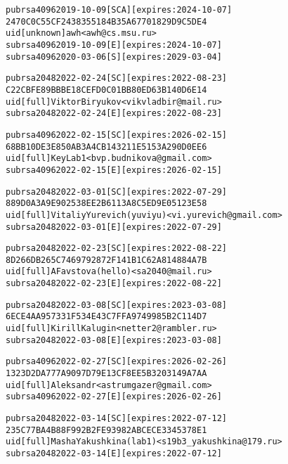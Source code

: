 \begin{alltt}
pub   rsa4096 2019-10-09 [SCA] [expires: 2024-10-07]
      2470C0C55CF2438355184B35A67701829D9C5DE4
uid           [ unknown] awh <awh@cs.msu.ru>
sub   rsa4096 2019-10-09 [E] [expires: 2024-10-07]
sub   rsa4096 2020-03-06 [S] [expires: 2029-03-04]

pub   rsa2048 2022-02-24 [SC] [expires: 2022-08-23]
      C22CBFE89BBBE18CEFD0C01BB80ED63B140D6E14
uid           [  full  ] Viktor Biryukov <vikvladbir@mail.ru>
sub   rsa2048 2022-02-24 [E] [expires: 2022-08-23]

pub   rsa4096 2022-02-15 [SC] [expires: 2026-02-15]
      68BB10DE3E850AB3A4CB143211E5153A290D0EE6
uid           [  full  ] KeyLab1 <bvp.budnikova@gmail.com>
sub   rsa4096 2022-02-15 [E] [expires: 2026-02-15]

pub   rsa2048 2022-03-01 [SC] [expires: 2022-07-29]
      889D0A3A9E902538EE2B6113A8C5ED9E05123E58
uid           [  full  ] Vitaliy Yurevich (yuviyu) <vi.yurevich@gmail.com>
sub   rsa2048 2022-03-01 [E] [expires: 2022-07-29]

pub   rsa2048 2022-02-23 [SC] [expires: 2022-08-22]
      8D266DB265C7469792872F141B1C62A814884A7B
uid           [  full  ] AFavstova (hello) <sa2040@mail.ru>
sub   rsa2048 2022-02-23 [E] [expires: 2022-08-22]

pub   rsa2048 2022-03-08 [SC] [expires: 2023-03-08]
      6ECE4AA957331F534E43C7FFA9749985B2C114D7
uid           [  full  ] Kirill Kalugin <netter2@rambler.ru>
sub   rsa2048 2022-03-08 [E] [expires: 2023-03-08]

pub   rsa4096 2022-02-27 [SC] [expires: 2026-02-26]
      1323D2DA777A9097D79E13CF8EE5B3203149A7AA
uid           [  full  ] Aleksandr <astrumgazer@gmail.com>
sub   rsa4096 2022-02-27 [E] [expires: 2026-02-26]

pub   rsa2048 2022-03-14 [SC] [expires: 2022-07-12]
      235C77BA4B88F992B2FE93982ABCECE3345378E1
uid           [  full  ] Masha Yakushkina (lab1) <s19b3_yakushkina@179.ru>
sub   rsa2048 2022-03-14 [E] [expires: 2022-07-12]
\end{alltt}
\pagebreak


